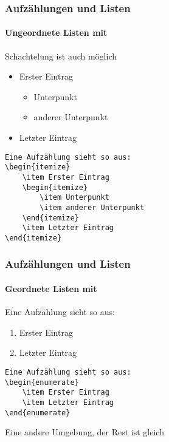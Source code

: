 \begin{frame}[fragile]
    \frametitle{Aufzählungen und Listen}
    \framesubtitle{Ungeordnete Listen mit }
    
    Schachtelung ist auch möglich
    \begin{itemize}
        \item Erster Eintrag
        \begin{itemize}
            \item Unterpunkt
            \item anderer Unterpunkt
        \end{itemize}
        \item Letzter Eintrag
    \end{itemize}
    
    \smallskip
    \begin{verbatim}
Eine Aufzählung sieht so aus:
\begin{itemize}
    \item Erster Eintrag
    \begin{itemize}
        \item Unterpunkt
        \item anderer Unterpunkt
    \end{itemize}
    \item Letzter Eintrag
\end{itemize}
    \end{verbatim}
\end{frame}


\begin{frame}[fragile]
    \frametitle{Aufzählungen und Listen}
    \framesubtitle{Geordnete Listen mit }
    
    Eine Aufzählung sieht so aus:
    \begin{enumerate}
        \item Erster Eintrag
        \item Letzter Eintrag
    \end{enumerate}
    
    \bigskip
    \begin{verbatim}
Eine Aufzählung sieht so aus:
\begin{enumerate}
    \item Erster Eintrag
    \item Letzter Eintrag
\end{enumerate}
    \end{verbatim}
    \medskip
    
    Eine andere Umgebung, der Rest ist gleich
\end{frame}


